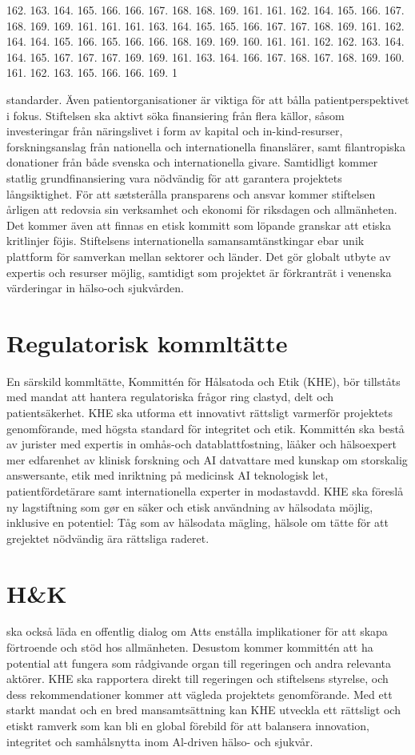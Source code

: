 {162. 163. 164. 165. 166. 166. 167. 168. 168. 169. 161. 161. 162. 164. 165. 166. 167. 168. 169. 169. 161. 161. 161. 163. 164. 165. 165. 166. 167. 167. 168. 169. 161. 162. 164. 164. 165. 166. 165. 166. 166. 168. 169. 169. 160. 161. 161. 162. 162. 163. 164. 164. 165. 167. 167. 167. 169. 169. 161. 163. 164. 166. 167. 168. 167. 168. 169. 160. 161. 162. 163. 165. 166. 166. 169. 1

standarder. Även patientorganisationer är viktiga för att bålla patientperspektivet i fokus.
Stiftelsen ska aktivt söka finansiering från flera källor, såsom investeringar från näringslivet i form av kapital och in-kind-resurser, forskningsanslag från nationella och internationella finanslärer, samt filantropiska donationer från både svenska och internationella givare. Samtidligt kommer statlig grundfinansiering vara nödvändig för att garantera projektets långsiktighet.
För att sætsterålla pransparens och ansvar kommer stiftelsen årligen att redovsia sin verksamhet och ekonomi för riksdagen och allmänheten. Det kommer även att finnas en etisk kommitt som löpande granskar att etiska kritlinjer föjis. Stiftelsens internationella samansamtänstkingar ebar unik plattform för samverkan mellan sektorer och länder. Det gör globalt utbyte av expertis och resurser möjlig, samtidigt som projektet är förkranträt i venenska värderingar in hälso-och sjukvården.
\section*{Regulatorisk kommltätte}
En särskild kommltätte, Kommittén för Hålsatoda och Etik (KHE), bör tillståts med mandat att hantera regulatoriska frågor ring clastyd, delt och patientsäkerhet. KHE ska utforma ett innovativt rättsligt varmerför projektets genomförande, med högsta standard för integritet och etik. Kommittén ska bestå av jurister med expertis in omhås-och datablattfostning, läåker och hälsoexpert mer edfarenhet av klinisk forskning och AI datvattare med kunskap om storskalig answersante, etik med inriktning på medicinsk AI teknologisk let, patientfördetärare samt internationella experter in modastavdd. KHE ska föreslå ny lagstiftning som gør en säker och etisk användning av hälsodata möjlig, inklusive en potentiel: Tåg som av hälsodata mägling, hälsole om tätte för att grejektet nödvändig ära rättsliga raderet.
\section*{H\&K} ska också läda en offentlig dialog om Atts enstålla implikationer för att skapa förtroende och stöd hos allmänheten. Desustom kommer kommittén att ha potential att fungera som rådgivande organ till regeringen och andra relevanta aktörer. KHE ska rapportera direkt till regeringen och stiftelsens styrelse, och dess rekommendationer kommer att vägleda projektets genomförande. Med ett starkt mandat och en bred mansamtsättning kan KHE utveckla ett rättsligt och etiskt ramverk som kan bli en global förebild för att balansera innovation, integritet och samhålsnytta inom Al-driven hälso- och sjukvår.
}
